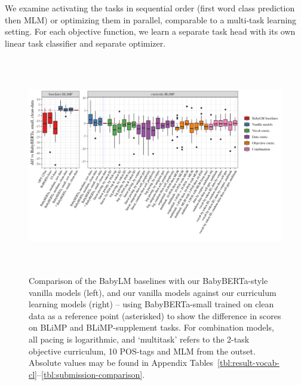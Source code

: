 We examine activating the tasks in sequential order (first word class prediction then MLM) or optimizing them in parallel, comparable to a multi-task learning setting. For each objective function, we learn a separate task head with its own linear task classifier and separate optimizer. 



\begin{figure}
\centering
\includegraphics[height=9.5cm]{chapters/climb/figures/babylm_blimp_diffs_boxplots.png}
\caption{\label{fig:blimp-boxplots} Comparison of the BabyLM baselines with our BabyBERTa-style vanilla models (left), and our vanilla models against our curriculum learning models (right) -- using BabyBERTa-small trained on clean data as a reference point (asterisked) to show the difference in scores on BLiMP and BLiMP-supplement tasks. For combination models, all pacing is logarithmic, and `multitask' refers to the 2-task objective curriculum, 10 POS-tags and MLM from the outset. Absolute values may be found in Appendix Tables~\ref{tbl:result-vocab-cl}--\ref{tbl:submission-comparison}.
}
\end{figure}

